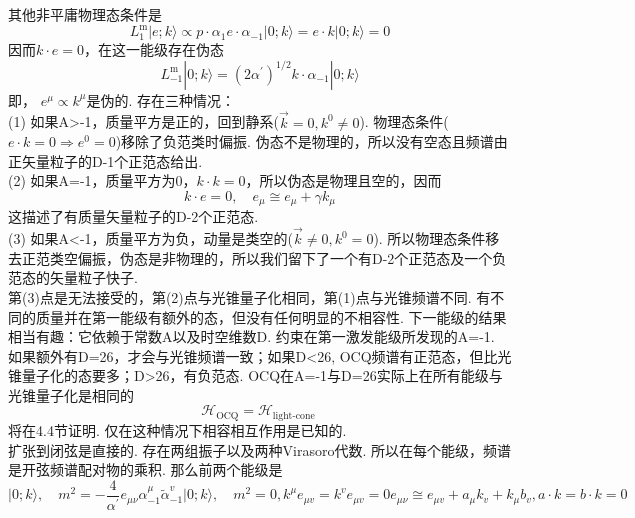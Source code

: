 其他非平庸物理态条件是
\begin{equation}
L_{1}^{\mathrm{m}}|e ; k\rangle \propto p \cdot \alpha_{1} e \cdot \alpha_{-1}|0 ; k\rangle=e \cdot k|0 ; k\rangle=0
\end{equation}
因而$k \cdot e=0$，在这一能级存在伪态
\begin{equation}
L_{-1}^{\mathrm{m}}|0 ; k\rangle=\left(2 \alpha^{\prime}\right)^{1 / 2} k \cdot \alpha_{-1}|0 ; k\rangle
\end{equation}
即， $e^{\mu} \propto k^{\mu}$是伪的. 存在三种情况：\\
(1)
如果A>-1，质量平方是正的，回到静系($\vec{k}=0, k^{0} \neq 0$). 物理态条件($e \cdot k=0  \Rightarrow e^{0}=0$)移除了负范类时偏振. 伪态不是物理的，所以没有空态且频谱由正矢量粒子的D-1个正范态给出.\\
(2)
如果A=-1，质量平方为0，$k \cdot k=0$，所以伪态是物理且空的，因而
\begin{equation}
k \cdot e=0, \quad e_{\mu} \cong e_{\mu}+\gamma k_{\mu}
\end{equation}
这描述了有质量矢量粒子的D-2个正范态.\\
(3)
如果A<-1，质量平方为负，动量是类空的($\vec{k} \neq 0, k^{0} = 0$). 所以物理态条件移去正范类空偏振，伪态是非物理的，所以我们留下了一个有D-2个正范态及一个负范态的矢量粒子快子.\\
第(3)点是无法接受的，第(2)点与光锥量子化相同，第(1)点与光锥频谱不同. 有不同的质量并在第一能级有额外的态，但没有任何明显的不相容性. 下一能级的结果相当有趣：它依赖于常数A以及时空维数D. 约束在第一激发能级所发现的A=-1. 如果额外有D=26，才会与光锥频谱一致；如果D<26, OCQ频谱有正范态，但比光锥量子化的态要多；D>26，有负范态. OCQ在A=-1与D=26实际上在所有能级与光锥量子化是相同的
\begin{equation}
\mathscr{H}_{\mathrm{OCQ}}=\mathscr{H}_{\text {light-cone }}
\end{equation}
将在4.4节证明. 仅在这种情况下相容相互作用是已知的.\\
扩张到闭弦是直接的. 存在两组振子以及两种Virasoro代数. 所以在每个能级，频谱是开弦频谱配对物的乘积. 那么前两个能级是 
\begin{subequations}
\begin{equation}
|0 ; k\rangle, \quad m^{2}=-\frac{4}{\alpha^{\prime}}
\end{equation}
\begin{equation}
e_{\mu \nu} \alpha_{-1}^{\mu} \tilde{\alpha}_{-1}^{v}|0 ; k\rangle, \quad m^{2}=0, k^{\mu} e_{\mu v}=k^{v} e_{\mu v}=0
\end{equation}
\begin{equation}
e_{\mu \nu} \cong e_{\mu v}+a_{\mu} k_{v}+k_{\mu} b_{v}, a \cdot k=b \cdot k=0
\end{equation}
\end{subequations}
